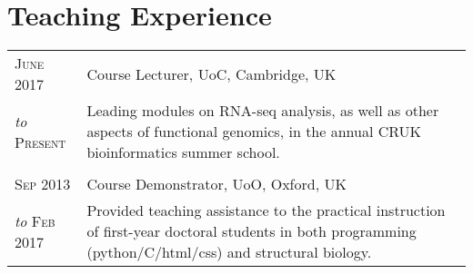 \section{Teaching Experience}
\begin{tabular}{>{\raggedleft}p{2.15cm}|p{12cm}}

\textsc{June 2017} &  Course Lecturer, UoC, Cambridge, UK \\
\emph{to} \textsc{Present} & Leading modules on RNA-seq analysis, as well as other aspects of functional genomics, in the annual CRUK bioinformatics summer school. \\

\multicolumn{2}{c}{}\\

\textsc{Sep 2013} &  Course Demonstrator, UoO, Oxford, UK \\
\emph{to} \textsc{Feb 2017} & Provided teaching assistance to the practical instruction of first-year doctoral students in both programming (python/C/html/css) and structural biology.\\



\end{tabular}
